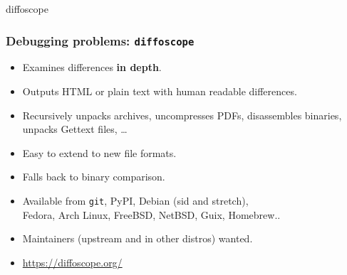 \documentclass[14pt]{beamer}
\begin{document}
{

\begin{frame}{diffoscope}
 \frametitle{Debugging problems: \texttt{diffoscope}}

 \begin{itemize}
  \item Examines differences \textbf{in depth}.
  \item Outputs HTML or plain text with human readable differences.
  \item Recursively unpacks archives, uncompresses PDFs, disassembles
  binaries, unpacks Gettext files, …
  \item Easy to extend to new file formats.
  \item Falls back to binary comparison.
  \item Available from \texttt{git}, PyPI, Debian (sid and stretch), \\
   Fedora, Arch Linux, FreeBSD, NetBSD, Guix, Homebrew..
  \item Maintainers (upstream and in other distros) wanted.
  \item \url{https://diffoscope.org/}
 \end{itemize}
\end{frame}


}
\end{document}

